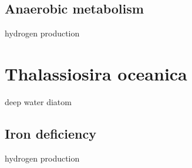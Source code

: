 \subsection{Anaerobic metabolism}

\begin{todo}
hydrogen production
\end{todo}

\section{Thalassiosira oceanica}

\begin{todo}
deep water diatom
\end{todo}

\subsection{Iron deficiency}

\begin{todo}
hydrogen production
\end{todo}

